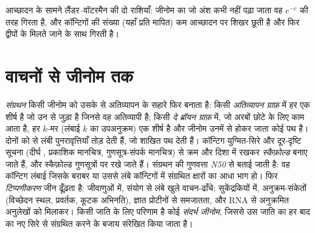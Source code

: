 \begin{omfigure}

{\small आच्छादन के सामने लैंडर--वॉटरमैन की दो राशियाँ: जीनोम का जो अंश
कभी नहीं पढ़ा जाता वह $e^{-c}$ की तरह गिरता है, और कॉन्टिगों की संख्या
(यहाँ प्रति  मापित) कम आच्छादन पर शिखर छूती है और फिर द्वीपों के
मिलते जाने के साथ गिरती है।}
\end{omfigure}

\section{वाचनों से जीनोम तक}

\begin{definition}\label{def:b3:genomics:assembly}
\emph{संग्रथन} किसी जीनोम को उसके  से अतिव्यापन के सहारे फिर
बनाता है: किसी \emph{अतिव्यापन ग्राफ़} में हर  एक शीर्ष है जो उन
 से जुड़ा है जिनसे वह अतिव्यापी है; किसी \emph{दे ब्रॉयन ग्राफ़}
में, जो अरबों छोटे  के लिए काम आता है, हर $k$-मर (लंबाई $k$ का
उपअनुक्रम) एक शीर्ष है और जीनोम उनमें से होकर जाता कोई पथ है। दोनों को
 से लंबी पुनरावृत्तियाँ तोड़ देती हैं, जो शाखित पथ देती हैं।
कॉन्टिग युग्मित-सिरे  और दूर-दृष्टि सूचना (दीर्घ , प्रकाशिक
मानचित्र, गुणसूत्र-संपर्क मानचित्र) से क्रम और दिशा में रखकर
\emph{स्कैफ़ोल्ड} बनाए जाते हैं, और स्कैफ़ोल्ड गुणसूत्रों पर रखे जाते
हैं। संग्रथन की गुणवत्ता \emph{N50} से बताई जाती है: वह कॉन्टिग लंबाई
जिसके बराबर या उससे लंबे कॉन्टिगों में संग्रथित क्षारों का आधा भाग हो।
फिर \emph{टिप्पणीकरण} जीन ढूँढ़ता है: जीवाणुओं में, संयोग से लंबे खुले
वाचन-ढाँचे; सुकेंद्रकियों में, अनुक्रम-संकेतों (विच्छेदन स्थल, प्रवर्तक,
कूटक अभिनति), ज्ञात प्रोटीनों से समजातता, और RNA से अनुक्रमित अनुलेखों
को मिलाकर। किसी जाति के लिए परिणाम है कोई \emph{संदर्भ जीनोम}, जिससे उस
जाति का हर बाद का  नए सिरे से संग्रथित करने के बजाय संरेखित किया
जाता है।
\end{definition}

